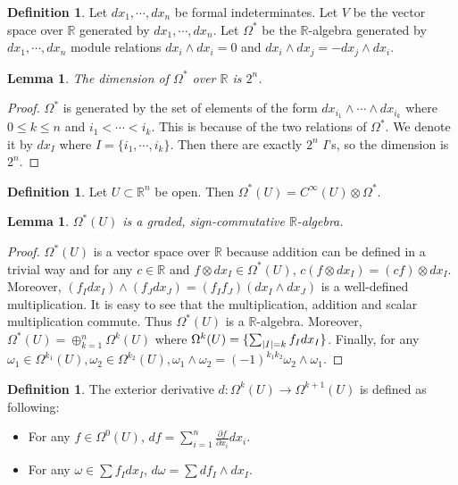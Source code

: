 \documentclass[psamsfonts]{amsart}
\newtheorem{lem}[thm]{Lemma}
\theoremstyle{definition}
\newtheorem{defn}[thm]{Definition}
\theoremstyle{rem}
\numberwithin{equation}{section}
\begin{document}
\begin{defn}
  Let $dx_1, \cdots, dx_n$ be formal indeterminates.
  Let $V$ be the vector space over $\mathbb{R}$ generated by $dx_1, \cdots, dx_n$.
  Let $\Omega^{\ast}$ be the $\mathbb{R}$-algebra generated by $dx_1, \cdots, dx_n$ module relations $dx_i \wedge dx_i = 0$ and $dx_i \wedge dx_j = - dx_j \wedge dx_i$.
\end{defn}

\begin{lem}
  The dimension of $\Omega^{\ast}$ over $\mathbb{R}$ is $2^n$.
\end{lem}

\begin{proof}
  $\Omega^{\ast}$ is generated by the set of elements of the form $dx_{i_1} \wedge \cdots \wedge dx_{i_k}$ where $0 \leq k \leq n$ and $i_1 < \cdots < i_k$.
  This is because of the two relations of $\Omega^{\ast}$.
  We denote it by $dx_{I}$ where $I = \{ i_1, \cdots, i_k \}$.
  Then there are exactly $2^n$ $I$'s, so the dimension is $2^n$.
\end{proof}

\begin{defn}
  Let $U \subset \mathbb{R}^n$ be open.
  Then $\Omega^{\ast}(U) = C^{\infty}(U) \otimes \Omega^{\ast}$.
\end{defn}

\begin{lem}
  $\Omega^{\ast}(U)$ is a graded, sign-commutative $\mathbb{R}$-algebra.
\end{lem}

\begin{proof}
  $\Omega^{\ast}(U)$ is a vector space over $\mathbb{R}$ because addition can be defined in a trivial way and for any $c \in \mathbb{R}$ and $f \otimes dx_I \in \Omega^{\ast}(U)$, $c(f \otimes dx_I) = (cf) \otimes dx_I$.
  Moreover, $(f_Idx_I) \wedge (f_Jdx_J) = (f_If_J)(dx_I \wedge dx_J)$ is a well-defined multiplication.
  It is easy to see that the multiplication, addition and scalar multiplication commute.
  Thus $\Omega^{\ast}(U)$ is a $\mathbb{R}$-algebra.
  Moreover, $\Omega^{\ast}(U) = \oplus_{k=1}^{n} \Omega^k(U)$ where $\Omega^k(U) = \{ \sum_{\abs{I} = k} f_Idx_I \}$.
  Finally, for any $\omega_1 \in \Omega^{k_1}(U), \omega_2 \in \Omega^{k_2}(U), \omega_1 \wedge \omega_2 = (-1)^{k_1k_2} \omega_2 \wedge \omega_1$.
\end{proof}

\begin{defn}
  The exterior derivative $d: \Omega^k(U) \rightarrow \Omega^{k + 1}(U)$ is defined as following:
  \begin{itemize}
    \item
      For any $f \in \Omega^0(U)$, $df = \sum_{i=1}^{n} \frac{\partial f}{\partial x_i} dx_i$.
    \item
      For any $\omega \in \sum f_Idx_I$, $d\omega = \sum df_I \wedge dx_I$.
  \end{itemize}
\end{defn}
\end{document}

